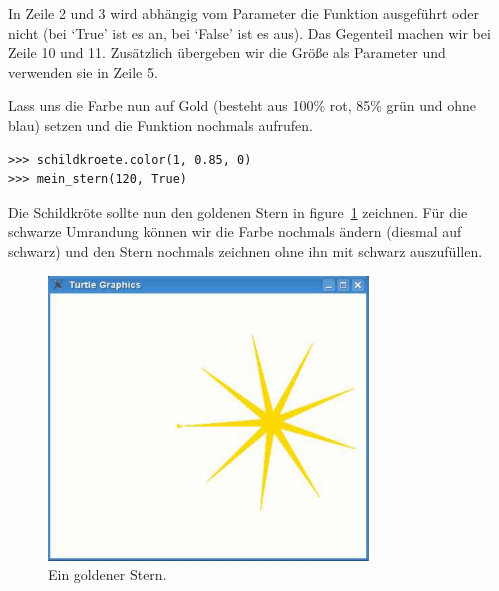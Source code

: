 In Zeile 2 und 3 wird abhängig vom Parameter  die Funktion  ausgeführt oder nicht (bei `True' ist es an, bei `False' ist es aus). Das Gegenteil machen wir bei Zeile 10 und 11. Zusätzlich übergeben wir die Größe als Parameter und verwenden sie in Zeile 5.
\par
Lass uns die Farbe nun auf Gold (besteht aus 100\% rot, 85\% grün und ohne blau) setzen und die Funktion nochmals aufrufen.

\begin{Verbatim}[frame=single]
>>> schildkroete.color(1, 0.85, 0)
>>> mein_stern(120, True)
\end{Verbatim}

\noindent
Die Schildkröte sollte nun den goldenen Stern in figure~\ref{fig29} zeichnen. Für die schwarze Umrandung können wir die Farbe nochmals ändern (diesmal auf schwarz) und den Stern nochmals zeichnen ohne ihn mit schwarz auszufüllen.

\begin{figure}
\begin{center}
\includegraphics[width=85mm]{images/figure29}
\end{center}
\caption{Ein goldener Stern.}\label{fig29}
\end{figure}


